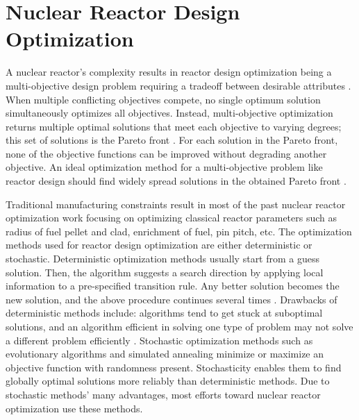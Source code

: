\section{Nuclear Reactor Design Optimization}
\label{sec:opt}
A nuclear reactor's complexity results in reactor design optimization being a 
multi-objective design problem requiring a tradeoff between desirable 
attributes \cite{byrne_evolving_2014,simon_sciences_2019}. 
When multiple conflicting objectives compete, no single optimum solution 
simultaneously optimizes all objectives. 
Instead, multi-objective optimization returns multiple optimal 
solutions that meet each objective to varying degrees; this set of solutions is 
the Pareto front \cite{deb_multi-objective_2001}. 
For each solution in the Pareto front, none of the objective functions can be 
improved without degrading another objective.
An ideal optimization method for a multi-objective problem like reactor design 
should find widely spread solutions in the obtained Pareto front 
\cite{deb_multi-objective_2001}. 

Traditional manufacturing constraints result in most of the past nuclear reactor 
optimization work focusing on optimizing classical reactor 
parameters such as radius of fuel pellet and clad, enrichment of fuel, 
pin pitch, etc. 
The optimization methods used for reactor design optimization are either 
deterministic or stochastic. 
Deterministic optimization methods usually start from a guess solution.
Then, the algorithm suggests a search direction by applying local 
information to a pre-specified transition rule. 
Any better solution becomes the new solution, and the above procedure continues 
several times \cite{deb_multi-objective_2001}. 
Drawbacks of deterministic methods include: algorithms tend to get stuck at
suboptimal solutions, and an algorithm efficient in solving one type of problem 
may not solve a different problem efficiently \cite{deb_multi-objective_2001}. 
Stochastic optimization methods such as evolutionary algorithms and simulated annealing
minimize or maximize an objective function with randomness present. 
Stochasticity enables them to find globally optimal solutions more reliably than 
deterministic methods. 
Due to stochastic methods' many advantages, most efforts toward nuclear 
reactor optimization use these methods. 

